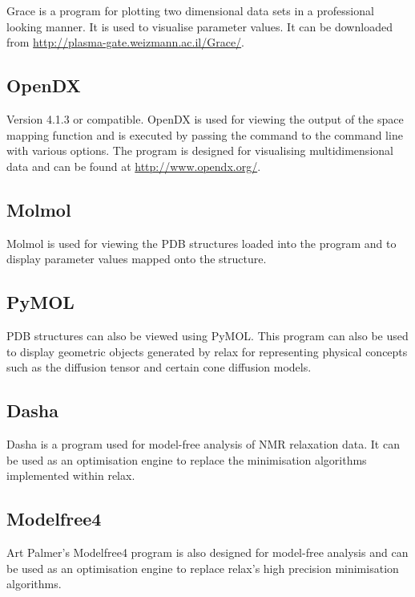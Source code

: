Grace is a program for plotting two dimensional data sets in a professional looking manner.
It is used to visualise parameter values.
It can be downloaded from \href{http://plasma-gate.weizmann.ac.il/Grace/}{http://plasma-gate.weizmann.ac.il/Grace/}.


\subsection{OpenDX}

Version 4.1.3 or compatible.
OpenDX is used for viewing the output of the space mapping function and is executed by passing the command  to the command line with various options.
The program is designed for visualising multidimensional data and can be found at \href{http://www.opendx.org/}{http://www.opendx.org/}.


\subsection{Molmol}

Molmol is used for viewing the PDB structures loaded into the program and to display parameter values mapped onto the structure.


\subsection{PyMOL}

PDB structures can also be viewed using PyMOL.
This program can also be used to display geometric objects generated by relax for representing physical concepts such as the diffusion tensor and certain cone diffusion models.


\subsection{Dasha}

Dasha is a program used for model-free analysis of NMR relaxation data.
It can be used as an optimisation engine to replace the minimisation algorithms implemented within relax.


\subsection{Modelfree4}

Art Palmer's Modelfree4 program is also designed for model-free analysis and can be used as an optimisation engine to replace relax's high precision minimisation algorithms.
